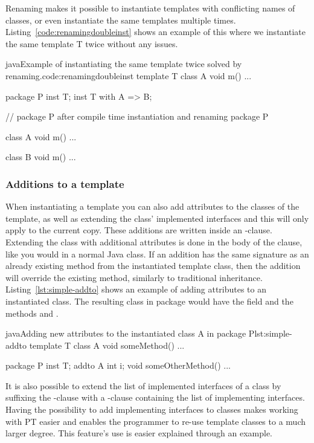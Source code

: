 Renaming makes it possible to instantiate templates with conflicting names of classes, or even instantiate the same templates multiple times.
Listing~\vref{code:renamingdoubleinst} shows an example of this where we instantiate the same template T twice without any issues.

\begin{code}{java}{Example of instantiating the same template twice solved by renaming.}{code:renamingdoubleinst}
template T {
    class A {
        void m() { ... }
    }
}

package P {
    inst T;
    inst T with A => B;
}

// package P after compile time instantiation and renaming
package P {
    class A {
        void m() { ... }
    }

    class B {
        void m() { ... }
    }
}
\end{code}

\subsubsection{Additions to a template}\label{subsubsec:additions}

When instantiating a template you can also add attributes to the classes of the template, as well as extending the class' implemented interfaces and this will only apply to the current copy.
These additions are written inside an -clause.
Extending the class with additional attributes is done in the body of the clause, like you would in a normal Java class.
If an addition has the same signature as an already existing method from the instantiated template class, then the addition will override the existing method, similarly to traditional inheritance.
Listing~\vref{lst:simple-addto} shows an example of adding attributes to an instantiated class.
The resulting class  in package  would have the field  and the methods  and .

\begin{code}{java}{Adding new attributes to the instantiated class A in package P}{lst:simple-addto}
    template T {
        class A {
            void someMethod() { ... }
        }
    }

    package P {
        inst T;
        addto A {
            int i;
            void someOtherMethod() { ... }
        }
    }
\end{code}

It is also possible to extend the list of implemented interfaces of a class by suffixing the -clause with a -clause containing the list of implementing interfaces.
Having the possibility to add implementing interfaces to classes makes working with PT easier and enables the programmer to re-use template classes to a much larger degree.
This feature's use is easier explained through an example.

